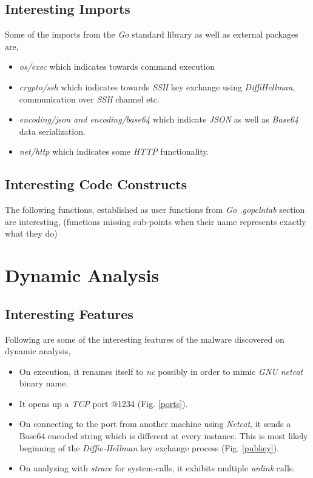 \documentclass[10pt,a4paper]{article}
\begin{document}
	\subsection{Interesting Imports}
	Some of the imports from the \textit{Go} standard library as well as external packages are,
	\begin{itemize}
		\vspace{-0.7em}
		\item \textit{os/exec} which indicates towards command execution
		\item \textit{crypto/ssh} which indicates towards \textit{SSH} key exchange using \textit{DiffiHellman}, communication over \textit{SSH} channel etc.
		\item \textit{encoding/json and encoding/base64} which indicate \textit{JSON} as well as \textit{Base64} data serialization.
		\item \textit{net/http} which indicates some \textit{HTTP} functionality.
	\end{itemize}

	\subsection{Interesting Code Constructs}
	The following functions, established as user functions from \textit{Go .gopclntab} section are interesting,
	(functions missing sub-points when their name represents exactly what they do)

\newpage
\section{Dynamic Analysis}
	\subsection{Interesting Features}
	Following are some of the interesting features of the malware discovered on dynamic analysis,
	\begin{itemize}
		\vspace{-0.7em}
		\item On execution, it renames itself to \textit{nc} possibly in order to mimic \textit{GNU netcat} binary name.
		\item It opens up a \textit{TCP} port @1234 (Fig. \ref{ports}).
		\item On connecting to the port from another machine using \textit{Netcat}, it sends a Base64 encoded string which is different at every instance. This is most likely beginning of the \textit{Diffie-Hellman} key exchange process (Fig. \ref{pubkey}).
		\item On analyzing with \textit{strace} for system-calls, it exhibits multiple \textit{unlink} calls.
	\end{itemize}
\newpage
\end{document}
